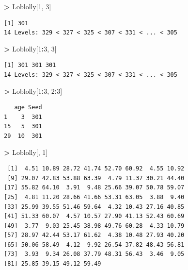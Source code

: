 \documentclass[]{krantz}
\makeatletter
\newenvironment{Shaded}{\begin{snugshade}}{\end{snugshade}}
\newcommand{\DecValTok}[1]{\textcolor[rgb]{0.06,0.06,0.06}{#1}}
\newcommand{\StringTok}[1]{\textcolor[rgb]{0.5,0.5,0.5}{#1}}
\newcommand{\OperatorTok}[1]{\textcolor[rgb]{0.43,0.43,0.43}{\textbf{#1}}}
\newcommand{\NormalTok}[1]{#1}
\newenvironment{kframe}{%
\medskip{}
\setlength{\fboxsep}{.8em}
 \def\at@end@of@kframe{}%
 \ifinner\ifhmode%
  \def\at@end@of@kframe{\end{minipage}}%
  \begin{minipage}{\columnwidth}%
 \fi\fi%
 \def\FrameCommand##1{\hskip\@totalleftmargin \hskip-\fboxsep
 \colorbox{shadecolor}{##1}\hskip-\fboxsep
     \hskip-\linewidth \hskip-\@totalleftmargin \hskip\columnwidth}%
 \MakeFramed {\advance\hsize-\width
   \@totalleftmargin\z@ \linewidth\hsize
   \@setminipage}}%
 {\par\unskip\endMakeFramed%
 \at@end@of@kframe}
\renewenvironment{Shaded}{\begin{kframe}}{\end{kframe}}
\theoremstyle{definition}
\theoremstyle{definition}
\theoremstyle{definition}
\theoremstyle{remark}
\makeatother
\begin{document}
\begin{Shaded}
\begin{Highlighting}[]
\OperatorTok{>}\StringTok{ }\NormalTok{Loblolly[}\DecValTok{1}\NormalTok{, }\DecValTok{3}\NormalTok{]}
\end{Highlighting}
\end{Shaded}

\begin{verbatim}
[1] 301
14 Levels: 329 < 327 < 325 < 307 < 331 < ... < 305
\end{verbatim}

\begin{Shaded}
\begin{Highlighting}[]
\OperatorTok{>}\StringTok{ }\NormalTok{Loblolly[}\DecValTok{1}\OperatorTok{:}\DecValTok{3}\NormalTok{, }\DecValTok{3}\NormalTok{]}
\end{Highlighting}
\end{Shaded}

\begin{verbatim}
[1] 301 301 301
14 Levels: 329 < 327 < 325 < 307 < 331 < ... < 305
\end{verbatim}

\begin{Shaded}
\begin{Highlighting}[]
\OperatorTok{>}\StringTok{ }\NormalTok{Loblolly[}\DecValTok{1}\OperatorTok{:}\DecValTok{3}\NormalTok{, }\DecValTok{2}\OperatorTok{:}\DecValTok{3}\NormalTok{]}
\end{Highlighting}
\end{Shaded}

\begin{verbatim}
   age Seed
1    3  301
15   5  301
29  10  301
\end{verbatim}

\begin{Shaded}
\begin{Highlighting}[]
\OperatorTok{>}\StringTok{ }\NormalTok{Loblolly[, }\DecValTok{1}\NormalTok{]}
\end{Highlighting}
\end{Shaded}

\begin{verbatim}
 [1]  4.51 10.89 28.72 41.74 52.70 60.92  4.55 10.92
 [9] 29.07 42.83 53.88 63.39  4.79 11.37 30.21 44.40
[17] 55.82 64.10  3.91  9.48 25.66 39.07 50.78 59.07
[25]  4.81 11.20 28.66 41.66 53.31 63.05  3.88  9.40
[33] 25.99 39.55 51.46 59.64  4.32 10.43 27.16 40.85
[41] 51.33 60.07  4.57 10.57 27.90 41.13 52.43 60.69
[49]  3.77  9.03 25.45 38.98 49.76 60.28  4.33 10.79
[57] 28.97 42.44 53.17 61.62  4.38 10.48 27.93 40.20
[65] 50.06 58.49  4.12  9.92 26.54 37.82 48.43 56.81
[73]  3.93  9.34 26.08 37.79 48.31 56.43  3.46  9.05
[81] 25.85 39.15 49.12 59.49
\end{verbatim}
\end{document}
